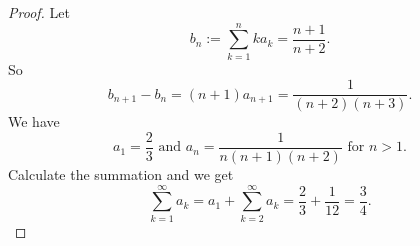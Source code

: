 \begin{Exercise}
\begin{proof}
Let $$b_n := \sum_{k=1}^{n} k a_k = \frac{n+1}{n+2}. $$
So $$b_{n+1}-b_n=(n+1)a_{n+1}=\frac{1}{(n+2)(n+3)}. $$
We have $$a_1=\frac{2}{3}\text{ and } a_n=\frac{1}{n(n+1)(n+2)}\mbox{ for }n > 1.$$
Calculate the summation and we get $$\sum_{k=1}^{\infty} a_k = a_1+\sum_{k=2}^{\infty} a_k = \frac{2}{3}+\frac{1}{12} = \frac{3}{4}.$$
\end{proof}
\end{Exercise}